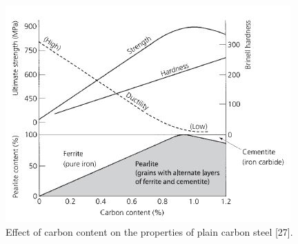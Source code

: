 \documentclass[12pt]{report}
\begin{document}
\begin{figure}[H]
    \centering
    \includegraphics[width=.65\textwidth]{effect_of_carbon_content.jpg}
    \caption{Effect of carbon content on the properties of plain carbon steel [27].}
    \label{ch3:figure:carbon}
\end{figure}
\end{document}
